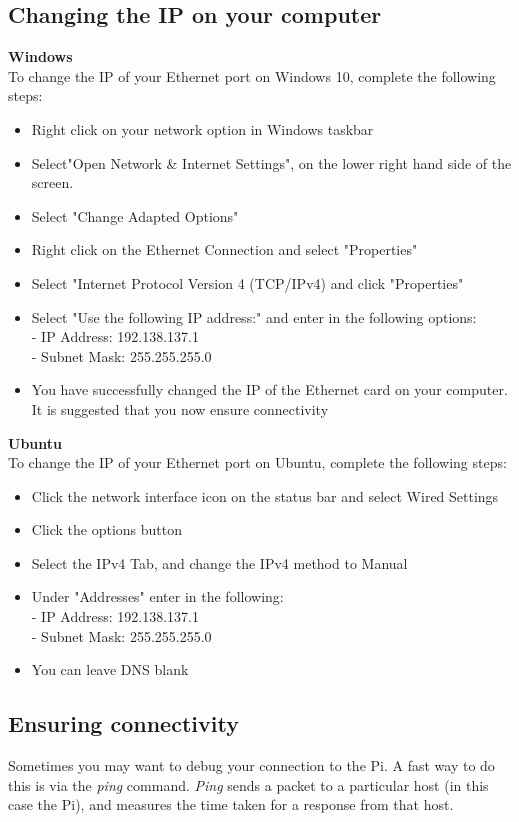 \subsection{Changing the IP on your computer}
\label{sec:Connectivity-ChangeComputerIP}
\textbf{Windows}\\
To change the IP of your Ethernet port on Windows 10, complete the following steps:
\begin{itemize}
    \item Right click on your network option in Windows taskbar
    \item Select"Open Network \& Internet Settings", on the lower right hand side of the screen.
    \item Select "Change Adapted Options"
    \item Right click on the Ethernet Connection and select "Properties"
    \item Select "Internet Protocol Version 4 (TCP/IPv4) and click "Properties"
    \item Select "Use the following IP address:" and enter in the following options:\\
            - IP Address: 192.138.137.1\\
            - Subnet Mask: 255.255.255.0
    \item You have successfully changed the IP of the Ethernet card on your computer. It is suggested that you now ensure connectivity
\end{itemize}

\textbf{Ubuntu}\\
To change the IP of your Ethernet port on Ubuntu, complete the following steps:
\begin{itemize}
    \item Click the network interface icon on the status bar and select Wired Settings
    \item Click the options button
    \item Select the IPv4 Tab, and change the IPv4 method to Manual
    \item Under "Addresses" enter in the following:\\
            - IP Address: 192.138.137.1\\
            - Subnet Mask: 255.255.255.0
    \item You can leave DNS blank
\end{itemize}

\subsection{Ensuring connectivity}
\label{sec:Connectivity-EnsuringConnectivity}
Sometimes you may want to debug your connection to the Pi. A fast way to do this is via the \textit{ping} command. \textit{Ping} sends a packet to a particular host (in this case the Pi), and measures the time taken for a response from that host. 

